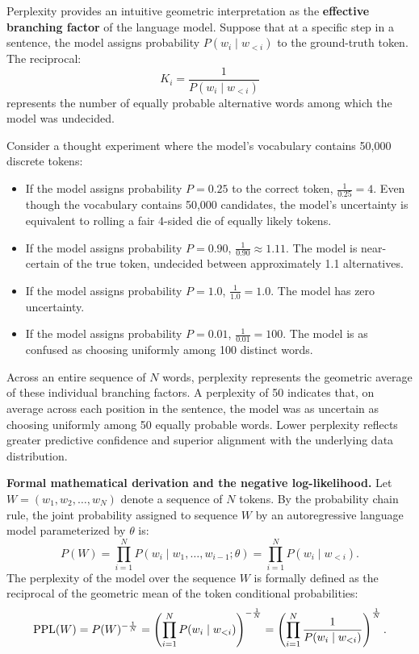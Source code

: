 \documentclass[../../main.tex]{subfiles}
\begin{document}
Perplexity provides an intuitive geometric interpretation as the \textbf{effective branching factor} of the language model. Suppose that at a specific step in a sentence, the model assigns probability $P(w_i \mid w_{<i})$ to the ground-truth token. The reciprocal:
\begin{equation}
\label{eq:equivalent_words_def}
K_i = \frac{1}{P(w_i \mid w_{<i})}
\end{equation}
represents the number of equally probable alternative words among which the model was undecided. 

Consider a thought experiment where the model's vocabulary contains 50,000 discrete tokens:
\begin{itemize}
    \item If the model assigns probability $P = 0.25$ to the correct token, $\frac{1}{0.25} = 4$. Even though the vocabulary contains 50,000 candidates, the model's uncertainty is equivalent to rolling a fair 4-sided die of equally likely tokens.
    \item If the model assigns probability $P = 0.90$, $\frac{1}{0.90} \approx 1.11$. The model is near-certain of the true token, undecided between approximately 1.1 alternatives.
    \item If the model assigns probability $P = 1.0$, $\frac{1}{1.0} = 1.0$. The model has zero uncertainty.
    \item If the model assigns probability $P = 0.01$, $\frac{1}{0.01} = 100$. The model is as confused as choosing uniformly among 100 distinct words.
\end{itemize}
Across an entire sequence of $N$ words, perplexity represents the geometric average of these individual branching factors. A perplexity of 50 indicates that, on average across each position in the sentence, the model was as uncertain as choosing uniformly among 50 equally probable words. Lower perplexity reflects greater predictive confidence and superior alignment with the underlying data distribution.

\noindent\textbf{Formal mathematical derivation and the negative log-likelihood.}\newline
Let $W = (w_1, w_2, \dots, w_N)$ denote a sequence of $N$ tokens. By the probability chain rule, the joint probability assigned to sequence $W$ by an autoregressive language model parameterized by $\theta$ is:
\begin{equation}
\label{eq:joint_prob_chain_rule}
P(W) = \prod_{i=1}^N P(w_i \mid w_1, \dots, w_{i-1}; \theta) = \prod_{i=1}^N P(w_i \mid w_{<i}).
\end{equation}
The perplexity of the model over the sequence $W$ is formally defined as the reciprocal of the geometric mean of the token conditional probabilities:
\begin{equation}
\label{eq:perplexity_def_geom}
\mathrm{PPL}(W) = P(W)^{-\frac{1}{N}} = \left( \prod_{i=1}^N P(w_i \mid w_{<i}) \right)^{-\frac{1}{N}} = \left( \prod_{i=1}^N \frac{1}{P(w_i \mid w_{<i})} \right)^{\frac{1}{N}}.
\end{equation}
\end{document}
